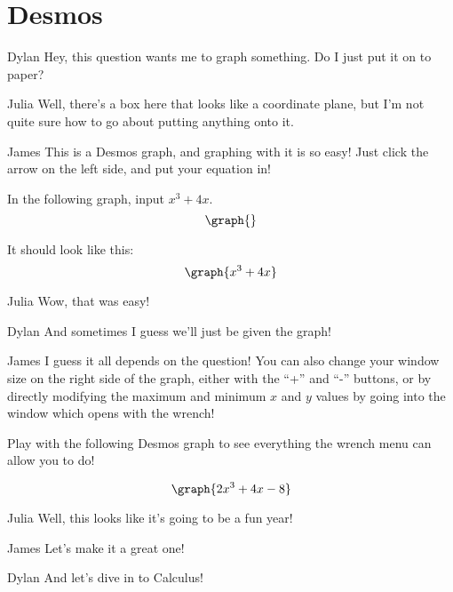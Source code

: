 \documentclass{ximera}
\begin{document}
\section{Desmos}
\begin{dialogue}
\item[Dylan] Hey, this question wants me to graph something. Do I just put it on to paper?
\item[Julia] Well, there's a box here that looks like a coordinate plane, but I'm not quite sure how to go about putting anything onto it.
\item[James] This is a Desmos graph, and graphing with it is so easy! Just click the arrow on the left side, and put your equation in!
\end{dialogue}

In the following graph, input $x^3+4x$.
\[
\graph{}
\]

It should look like this:
\[
\graph{x^3+4x}
\]

\begin{dialogue}
\item[Julia] Wow, that was easy!
\item[Dylan] And sometimes I guess we'll just be given the graph!
\item[James] I guess it all depends on the question! You can also change your window size on the right side of the graph, either with the ``+'' and ``-'' buttons, or by directly modifying the maximum and minimum $x$ and $y$ values by going into the window which opens with the wrench!
\end{dialogue}

Play with the following Desmos graph to see everything the wrench menu can allow you to do!

\[
\graph{2x^3+4x-8}
\]

\begin{dialogue}
\item[Julia] Well, this looks like it's going to be a fun year!
\item[James] Let's make it a great one!
\item[Dylan] And let's dive in to Calculus!
\end{dialogue}
\end{document}
